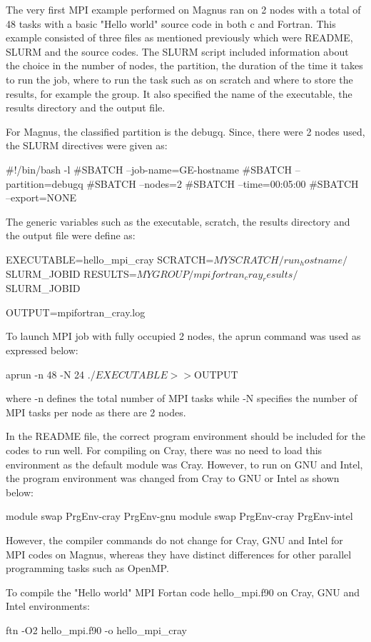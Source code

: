\documentclass[journal]{IEEEtran}
\begin{document}
The very first MPI example performed on Magnus ran on 2 nodes with a total of 48 tasks with a basic "Hello world" source code in both c and Fortran. 
This example consisted of three files as mentioned previously which were README, SLURM and the source codes. The SLURM script included information about
the choice in the number of nodes, the partition, the duration of the time it takes to run the job, where to run the task such as on scratch and where
to store the results, for example the group. It also specified the name of the executable, the results directory and the output file. 

For Magnus, the classified partition is the debugq. Since, there were 2 nodes used, the SLURM directives were given as:

#!/bin/bash -l
#SBATCH --job-name=GE-hostname
#SBATCH --partition=debugq
#SBATCH --nodes=2
#SBATCH --time=00:05:00
#SBATCH --export=NONE

The generic variables such as the executable, scratch, the results directory and the output file were define as:

EXECUTABLE=hello_mpi_cray
SCRATCH=$MYSCRATCH/run_hostname/$SLURM_JOBID
RESULTS=$MYGROUP/mpifortran_cray_results/$SLURM_JOBID

OUTPUT=mpifortran_cray.log 

To launch MPI job with fully occupied 2 nodes, the aprun command was used as expressed below:

aprun -n 48 -N 24 ./$EXECUTABLE >> ${OUTPUT}

where -n defines the total number of MPI tasks while -N specifies the number of MPI tasks per node as there are 2 nodes.

In the README file, the correct program environment should be included for the codes to run well. For compiling on Cray, there was no need to load
this environment as the default module was Cray. However, to run on GNU and Intel, the program environment was changed from Cray to GNU or Intel as
shown below:

module swap PrgEnv-cray PrgEnv-gnu
module swap PrgEnv-cray PrgEnv-intel

However, the compiler commands do not change for Cray, GNU and Intel for MPI codes on Magnus, whereas they have distinct differences for other parallel
programming tasks such as OpenMP.

To compile the "Hello world" MPI Fortan code hello_mpi.f90 on Cray, GNU and Intel environments:

ftn -O2 hello_mpi.f90 -o hello_mpi_cray
\end{document}
